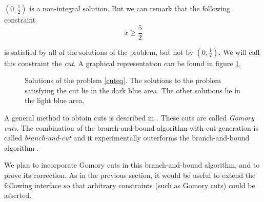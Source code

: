 \documentclass{article}
\begin{document}
$(0, \frac{1}{2})$ is a non-integral solution. But we can remark that the
following constraint $$x \geqslant \frac{5}{2}$$

is satisfied by all of the
solutions of the problem, but not by $(0, \frac{1}{2})$. We will call this
constraint the \textit{cut}. A graphical representation can be found in figure
\ref{cutfig}.

\begin{figure}[h]
  \label{cutfig}
  \centering


  \caption{Solutions of the problem \ref{cuteq}.
          The solutions to the problem satisfying the cut lie in the dark blue
          area. The other solutions lie in the light blue area.
          }
\end{figure}

A general method to obtain cuts is described in \cite[Section 4]{Dutertre2006}.
These cuts are called \textit{Gomory cuts}. The combination of the
branch-and-bound algorithm with cut generation is called
\textit{branch-and-cut} and it experimentally outerforms the branch-and-bound
algorithm \cite{Ongoing2012}.

We plan to incorporate Gomory cuts in this branch-and-bound algorithm,
and to prove its correction. As in the previous section, it would
be useful to extend the following interface so that arbitrary constraints (such
as Gomory cuts) could be asserted.
\end{document}
